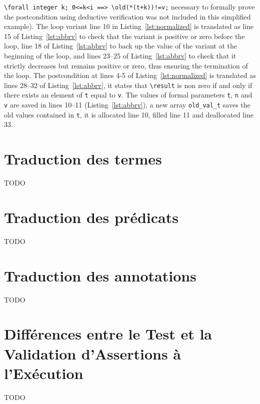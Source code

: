 \lstinline|\forall integer k; 0<=k<i ==> \old(*(t+k))!=v;|
necessary to formally prove the postcondition using deductive verification
was not included in this simplified example).
The loop variant line 10 in Listing~\ref{lst:normalized} is translated as
line 15 of Listing~\ref{lst:abbrv} to check that the variant is positive or
zero before the loop, line 18 of Listing~\ref{lst:abbrv} to back up the
value of the variant at the beginning of the loop, and lines 23--25 of
Listing~\ref{lst:abbrv} to check that it strictly decreases but remains positive
or zero, thus ensuring the termination of the loop.
The postcondition at lines 4-5 of Listing~\ref{lst:normalized} is translated as
lines 28--32 of Listing~\ref{lst:abbrv}, it states that \lstinline|\result| is
non zero if and only if there exists an element of \lstinline|t| equal
to \lstinline|v|.
The values of formal parameters \lstinline|t|, \lstinline|n| and
\lstinline|v|
are saved in lines 10--11
(Listing~\ref{lst:abbrv}), a new array \lstinline|old_val_t| saves the old values
contained in \lstinline|t|, it is allocated line 10, filled line 11 and
deallocated line 33.



\section{Traduction des termes \acsl}
\label{sec:term}

TODO


\section{Traduction des prédicats \acsl}
\label{sec:pred}

TODO


\section{Traduction des annotations \acsl}
\label{sec:annot}

TODO


\section{Différences entre le Test et la Validation d'Assertions à l'Exécution}

TODO
